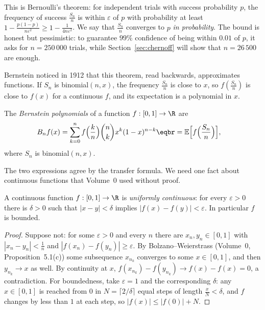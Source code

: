 This is Bernoulli's theorem: for independent trials with success probability $p$, the frequency of success
$\frac{S_n}n$ is within $\varepsilon$ of $p$ with probability at least $1-\frac{p(1-p)}{n\varepsilon^2}\ge1-\frac1{4n\varepsilon^2}$. We say that $\frac{S_n}n$ converges
to $p$ \emph{in probability}. The bound is honest but pessimistic: to guarantee $99\%$ confidence of being within
$0.01$ of $p$, it asks for $n=250\,000$ trials, while Section~\ref{sec:chernoff} will show that $n=26\,500$ are enough.

Bernstein noticed in 1912 that this theorem, read backwards, approximates functions. If $S_n$ is binomial$(n,x)$, the
frequency $\frac{S_n}n$ is close to $x$, so $f(\frac{S_n}n)$ is close to $f(x)$ for a continuous $f$, and its expectation is a
polynomial in $x$.

\begin{definition}
The \emph{Bernstein polynomials} of a function $f:[0,1]\to\R$ are
\[
\begin{aligned}B_nf(x)&=\sum_{k=0}^nf\Bigl(\frac kn\Bigr)\binom nkx^k(1-x)^{n-k}\eqbr=\mathbb E\Bigl[f\Bigl(\frac{S_n}n\Bigr)\Bigr],\end{aligned}
\]
where $S_n$ is binomial$(n,x)$.
\end{definition}

The two expressions agree by the transfer formula. We need one fact about continuous functions that Volume~0 used
without proof.

\begin{lemma}[Heine]\label{lem:heine}
A continuous function $f:[0,1]\to\R$ is \emph{uniformly continuous}: for every $\varepsilon>0$ there is $\delta>0$ such that
$|x-y|<\delta$ implies $|f(x)-f(y)|<\varepsilon$. In particular $f$ is bounded.
\end{lemma}
\begin{proof}
Suppose not: for some $\varepsilon>0$ and every $n$ there are $x_n,y_n\in[0,1]$ with $|x_n-y_n|<\frac1n$ and $|f(x_n)-f(y_n)|\ge\varepsilon$. By
Bolzano--Weierstrass (Volume~0, Proposition~5.1(c)) some subsequence $x_{n_k}$ converges to some $x\in[0,1]$, and then
$y_{n_k}\to x$ as well. By continuity at $x$, $f(x_{n_k})-f(y_{n_k})\to f(x)-f(x)=0$, a contradiction. For boundedness, take
$\varepsilon=1$ and the corresponding $\delta$: any $x\in[0,1]$ is reached from $0$ in $N=\lceil2/\delta\rceil$ equal steps of length $\frac xN<\delta$, and $f$
changes by less than $1$ at each step, so $|f(x)|\le|f(0)|+N$.
\end{proof}

